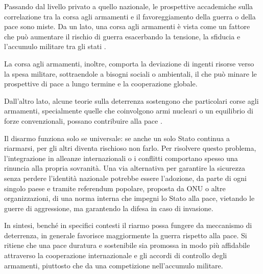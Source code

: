 \documentclass[12pt]{book} %
\begin{document}
Passando dal livello privato a quello nazionale, le prospettive accademiche sulla correlazione tra la corsa agli armamenti e il favoreggiamento della guerra o della pace sono miste. Da un lato, una corsa agli armamenti è vista come un fattore che può aumentare il rischio di guerra esacerbando la tensione, la sfiducia e l'accumulo militare tra gli stati .

La corsa agli armamenti, inoltre, comporta la deviazione di ingenti risorse verso la spesa militare, sottraendole a bisogni sociali o ambientali, il che può minare le prospettive di pace a lungo termine e la cooperazione globale.

Dall'altro lato, alcune teorie sulla deterrenza sostengono che particolari corse agli armamenti, specialmente quelle che coinvolgono armi nucleari o un equilibrio di forze convenzionali, possano contribuire alla pace . 

Il disarmo funziona solo se universale: se anche un solo Stato continua a riarmarsi, per gli altri diventa rischioso non farlo. Per risolvere questo problema, l'integrazione in alleanze internazionali o i conflitti comportano spesso una rinuncia alla propria sovranità. Una via alternativa per garantire la sicurezza senza perdere l'identità nazionale potrebbe essere l'adozione, da parte di ogni singolo paese e tramite referendum popolare, proposta da ONU o altre organizzazioni, di una norma interna che impegni lo Stato alla pace, vietando le guerre di aggressione, ma garantendo la difesa in caso di invasione. 

In sintesi, benché in specifici contesti il riarmo possa fungere da meccanismo di deterrenza, in generale favorisce maggiormente la guerra rispetto alla pace. Si ritiene che una pace duratura e sostenibile sia promossa in modo più affidabile attraverso la cooperazione internazionale e gli accordi di controllo degli armamenti, piuttosto che da una competizione nell'accumulo militare.
\end{document}
